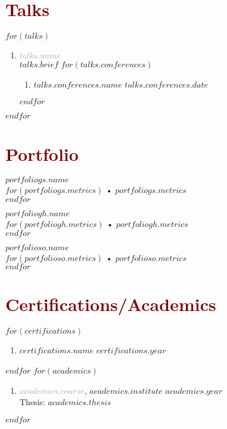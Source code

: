 \documentclass[$fontsize$, a4paper]{article}
\begin{document}
\section*{\textcolor{Maroon}{Talks}}
$for(talks)$
  \begin{enumerate}
    [topsep=10pt,itemsep=0pt,parsep=0pt,partopsep=0pt,leftmargin=10pt,label=•]
    \item{\textcolor{darkgray}{\textbf{$talks.name$}}\\$talks.brief$}
    $for(talks.conferences)$
    \begin{enumerate}
      [topsep=0pt,itemsep=0pt,parsep=0pt,partopsep=0pt,leftmargin=10pt,label=•]
      \item{\href{$talks.conferences.url$}{$talks.conferences.name$} \hfill $talks.conferences.date$}
    \end{enumerate}
    $endfor$
  \end{enumerate}
$endfor$

\section*{\textcolor{Maroon}{Portfolio}}
\begin{multicols}{3}
  \textcolor{darkgray}{} \href{$portfoliogs.url$}{$portfoliogs.name$}\\
  $for(portfoliogs.metrics)$
    • $portfoliogs.metrics$\\
  $endfor$

\columnbreak
  \textcolor{darkgray}{} \href{$portfoliogh.url$}{$portfoliogh.name$}\\
  $for(portfoliogh.metrics)$
    • $portfoliogh.metrics$\\
  $endfor$

\columnbreak
  \textcolor{darkgray}{} \href{$portfolioso.url$}{$portfolioso.name$}\\
  $for(portfolioso.metrics)$
    • $portfolioso.metrics$\\
  $endfor$
\end{multicols}

\section*{\textcolor{Maroon}{Certifications/Academics}}
$for(certifications)$
  \begin{enumerate}
    [topsep=0pt,itemsep=0pt,parsep=0pt,partopsep=0pt,leftmargin=10pt,label=•]
    \item{\href{$certifications.url$}{$certifications.name$} \hfill $certifications.year$}
  \end{enumerate}
$endfor$
\vspace{0.3cm}
$for(academics)$
  \begin{enumerate}
    [topsep=0pt,itemsep=0pt,parsep=0pt,partopsep=0pt,leftmargin=10pt,label=•]
    \item{\textcolor{darkgray}{\textbf{$academics.course$}}, \textbf{\href{$academics.url$}{$academics.institute$}} \hfill $academics.year$\\Thesis: \href{$academics.thesis_url$}{$academics.thesis$}}
  \end{enumerate}
$endfor$
\end{document}
